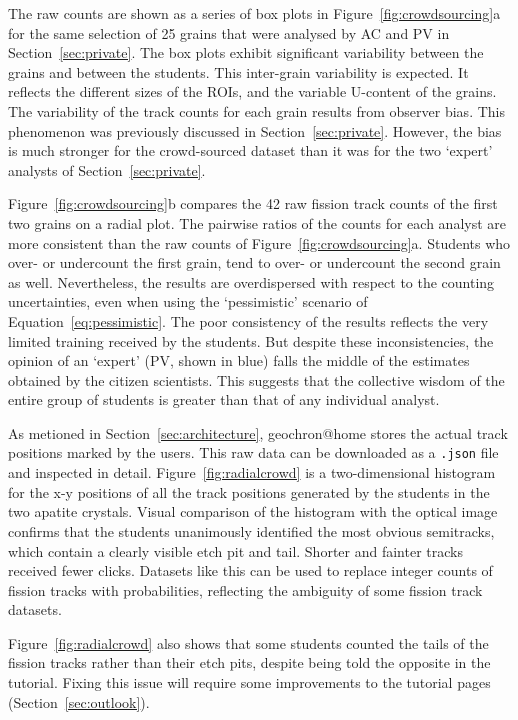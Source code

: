 \documentclass[gchron, manuscript]{copernicus}
\begin{document}
The raw counts are shown as a series of box plots in
Figure~\ref{fig:crowdsourcing}a for the same selection of 25 grains
that were analysed by AC and PV in Section~\ref{sec:private}. The box
plots exhibit significant variability between the grains and between
the students. This inter-grain variability is expected. It reflects
the different sizes of the ROIs, and the variable U-content of the
grains. The variability of the track counts for each grain results
from observer bias. This phenomenon was previously discussed in
Section~\ref{sec:private}. However, the bias is much stronger for the
crowd-sourced dataset than it was for the two `expert' analysts of
Section~\ref{sec:private}.\medskip

Figure~\ref{fig:crowdsourcing}b compares the 42 raw fission track
counts of the first two grains on a radial plot.  The pairwise ratios
of the counts for each analyst are more consistent than the raw counts
of Figure~\ref{fig:crowdsourcing}a.  Students who over- or undercount
the first grain, tend to over- or undercount the second grain as
well. Nevertheless, the results are overdispersed with respect to the
counting uncertainties, even when using the `pessimistic' scenario of
Equation~\ref{eq:pessimistic}.  The poor consistency of the results
reflects the very limited training received by the students. But
despite these inconsistencies, the opinion of an `expert' (PV, shown
in blue) falls the middle of the estimates obtained by the citizen
scientists. This suggests that the collective wisdom of the entire
group of students is greater than that of any individual
analyst.\medskip

As metioned in Section~\ref{sec:architecture}, geochron@home stores
the actual track positions marked by the users. This raw data can be
downloaded as a \texttt{.json} file and inspected in detail.
Figure~\ref{fig:radialcrowd} is a two-dimensional histogram for the
x-y positions of all the track positions generated by the students in
the two apatite crystals. Visual comparison of the histogram with the
optical image confirms that the students unanimously identified the
most obvious semitracks, which contain a clearly visible etch pit and
tail. Shorter and fainter tracks received fewer clicks. Datasets like
this can be used to replace integer counts of fission tracks with
probabilities, reflecting the ambiguity of some fission track
datasets.\medskip

Figure~\ref{fig:radialcrowd} also shows that some students counted the
tails of the fission tracks rather than their etch pits, despite being
told the opposite in the tutorial. Fixing this issue will require some
improvements to the tutorial pages (Section~\ref{sec:outlook}).
\end{document}
